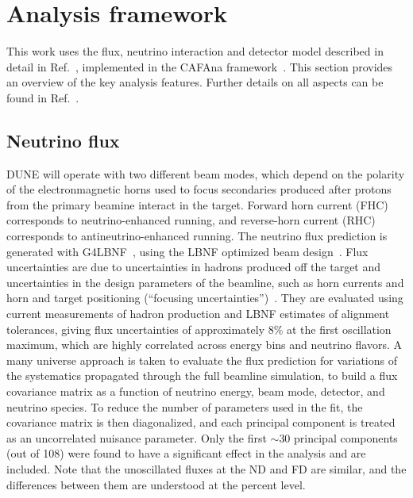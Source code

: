 \section{Analysis framework}
\label{sec:analysis_framework}
This work uses the flux, neutrino interaction and detector model described in detail in Ref.~\cite{Abi:2020qib}, implemented in the CAFAna framework~\cite{CAFAna}. This section provides an overview of the key analysis features. Further details on all aspects can be found in Ref.~\cite{Abi:2020qib}.

\subsection{Neutrino flux}
DUNE will operate with two different beam modes, which depend on the polarity of the electronmagnetic horns used to focus secondaries produced after protons from the primary beamine interact in the target. Forward horn current (FHC) corresponds to neutrino-enhanced running, and reverse-horn current (RHC) corresponds to antineutrino-enhanced running. The neutrino flux prediction is generated with G4LBNF~\cite{Aliaga:2016oaz,Abi:2020evt}, using the LBNF optimized beam design~\cite{Abi:2020evt}. Flux uncertainties are due to uncertainties in hadrons produced off the target and uncertainties in the design parameters of the beamline, such as horn currents and horn and target positioning (``focusing uncertainties'')~\cite{Abi:2020evt}. They are evaluated using current measurements of hadron production and LBNF estimates of alignment tolerances, giving flux uncertainties of approximately 8\% at the first oscillation maximum, which are highly correlated across energy bins and neutrino flavors. A many universe approach is taken to evaluate the flux prediction for variations of the systematics propagated through the full beamline simulation, to build a flux covariance matrix as a function of neutrino energy, beam mode, detector, and neutrino species. To reduce the number of parameters used in the fit, the covariance matrix is then diagonalized, and each principal component is treated as an uncorrelated nuisance parameter. Only the first $\sim$30 principal components (out of 108) were found to have a significant effect in the analysis and are included. Note that the unoscillated fluxes at the ND and FD are similar, and the differences between them are understood at the percent level.

